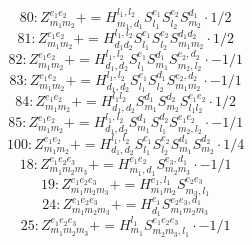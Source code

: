 \documentclass[letterpaper,10pt,fleqn,leqno,onecolumn]{article}
\begin{document}
\begin{equation} \;\;\;\;\;\;  80: Z^{e_{1}e_{2}}_{m_{1}m_{2}}+=H^{l_{1},l_{2}}_{m_{1},d_{1}}S^{e_{1}}_{l_{1}}S^{e_{2}}_{l_{2}}S^{d_{1}}_{m_{2}}\cdot 1/2 \end{equation}
\begin{equation} \;\;\;\;\;\;  81: Z^{e_{1}e_{2}}_{m_{1}m_{2}}+=H^{l_{1},l_{2}}_{d_{1}d_{2}}S^{e_{1}}_{l_{1}}S^{e_{2}}_{l_{2}}S^{d_{1}d_{2}}_{m_{1}m_{2}}\cdot 1/2 \end{equation}
\begin{equation} \;\;\;\;\;\;  82: Z^{e_{1}e_{2}}_{m_{1}m_{2}}+=H^{l_{1},l_{2}}_{d_{1},d_{2}}S^{e_{1}}_{l_{1}}S^{d_{1}}_{m_{1}}S^{e_{2},d_{2}}_{m_{2},l_{2}}\cdot -1/1 \end{equation}
\begin{equation} \;\;\;\;\;\;  83: Z^{e_{1}e_{2}}_{m_{1}m_{2}}+=H^{l_{1},l_{2}}_{d_{1},d_{2}}S^{e_{1}}_{l_{1}}S^{d_{1}}_{l_{2}}S^{e_{2},d_{2}}_{m_{1}m_{2}}\cdot -1/1 \end{equation}
\begin{equation} \;\;\;\;\;\;  84: Z^{e_{1}e_{2}}_{m_{1}m_{2}}+=H^{l_{1}l_{2}}_{d_{1},d_{2}}S^{d_{1}}_{m_{1}}S^{d_{2}}_{m_{2}}S^{e_{1}e_{2}}_{l_{1}l_{2}}\cdot 1/2 \end{equation}
\begin{equation} \;\;\;\;\;\;  85: Z^{e_{1}e_{2}}_{m_{1}m_{2}}+=H^{l_{1},l_{2}}_{d_{1},d_{2}}S^{d_{1}}_{m_{1}}S^{d_{2}}_{l_{1}}S^{e_{1}e_{2}}_{m_{2},l_{2}}\cdot -1/1 \end{equation}
\begin{equation} \;\;\;\;\;\;  100: Z^{e_{1}e_{2}}_{m_{1}m_{2}}+=H^{l_{1},l_{2}}_{d_{1},d_{2}}S^{e_{1}}_{l_{1}}S^{e_{2}}_{l_{2}}S^{d_{1}}_{m_{1}}S^{d_{2}}_{m_{2}}\cdot 1/4 \end{equation}
\begin{equation} \;\;\;\;\;\;  18: Z^{e_{1}e_{2}e_{3}}_{m_{1}m_{2}m_{3}}+=H^{e_{1}e_{2}}_{m_{1},d_{1}}S^{e_{3},d_{1}}_{m_{2}m_{3}}\cdot -1/1 \end{equation}
\begin{equation} \;\;\;\;\;\;  19: Z^{e_{1}e_{2}e_{3}}_{m_{1}m_{2}m_{3}}+=H^{e_{1},l_{1}}_{m_{1}m_{2}}S^{e_{2}e_{3}}_{m_{3},l_{1}} \end{equation}
\begin{equation} \;\;\;\;\;\;  24: Z^{e_{1}e_{2}e_{3}}_{m_{1}m_{2}m_{3}}+=H^{e_{1}}_{d_{1}}S^{e_{2}e_{3},d_{1}}_{m_{1}m_{2}m_{3}} \end{equation}
\begin{equation} \;\;\;\;\;\;  25: Z^{e_{1}e_{2}e_{3}}_{m_{1}m_{2}m_{3}}+=H^{l_{1}}_{m_{1}}S^{e_{1}e_{2}e_{3}}_{m_{2}m_{3},l_{1}}\cdot -1/1 \end{equation}
\end{document}

